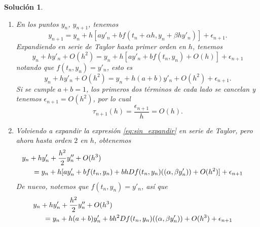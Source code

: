 \documentclass[11pt]{article}
\newtheorem*{sol}{Solución}
\begin{document}
\begin{sol}
  \begin{enumerate}
    \item
      En los puntos $y_n$, $y_{n+1}$, tenemos
      \begin{equation}\label{eq:sin_expandir}
        y_{n+1}
        = y_{n} + h[ay'_n + bf(t_n + \alpha h, y_n + \beta h y'_n)] +
        \epsilon_{n+1}
      .\end{equation}
      Expandiendo en serie de Taylor hasta primer orden en $h$,
      tenemos
      \begin{equation}
        y_n + hy'_{n} + O(h^{2})
        = y_{n} + h[ay'_n + b f(t_n,y_n) + O(h)] +
        \epsilon_{n+1}
      \end{equation}
      notando que $f(t_n,y_n)=y'_n$, esto es
      \begin{equation}
        y_n + hy'_{n} + O(h^{2})
        = y_{n} + h(a+b)y'_n + O(h^{2}) +
        \epsilon_{n+1}
      .\end{equation}
      Si se cumple $a+b=1$, los primeros dos términos de cada lado se
      cancelan y tenemos $\epsilon_{n+1} = O(h^{2})$, por lo cual
      \begin{equation}
        \tau_{n+1}(h) = \frac{\epsilon_{n+1}}{h} = O(h)
      .\end{equation}
    \item
      Volviendo a expandir la expresión \eqref{eq:sin_expandir} en
      serie de Taylor, pero ahora hasta orden $2$ en $h$, obtenemos
      \begin{equation}
        \begin{split}
          &\hspace{-5mm}
          y_n + hy'_{n} + \frac{h^{2}}{2}y''_n + O(h^{3}) \\
          &= y_{n}
          + h[
          ay'_n + b f(t_n,y_n) + bh Df(t_n,y_n)((\alpha, \beta y'_n))
          + O(h^{2})]
          + \epsilon_{n+1}
        \end{split}
      \end{equation}
      De nuevo, notemos que $f(t_n,y_n)=y'_n$, así que
      \begin{equation}
        \begin{split}
          &\hspace{-5mm}
          y_n + hy'_{n} + \frac{h^{2}}{2}y''_n + O(h^{3}) \\
          &= y_{n}
          + h(a+b)y'_n
          + bh^{2} Df(t_n,y_n)((\alpha, \beta y'_n))
          + O(h^{3})
          + \epsilon_{n+1}
        \end{split}

\end{equation}
\end{enumerate}
\end{sol}
\end{document}
